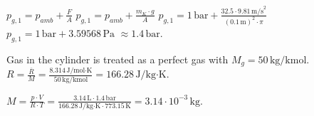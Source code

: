 \( p_{g,1} = p_{amb} + \frac{F}{A} \)  
\( p_{g,1} = p_{amb} + \frac{m_K \cdot g}{A} \)  
\( p_{g,1} = 1 \, \text{bar} + \frac{32.5 \cdot 9.81 \, \text{m/s}^2}{\left(0.1 \, \text{m}\right)^2 \cdot \pi} \)  
\( p_{g,1} = 1 \, \text{bar} + 3.59568 \, \text{Pa} \)  
\( \approx 1.4 \, \text{bar} \).  

Gas in the cylinder is treated as a perfect gas with \( M_g = 50 \, \text{kg/kmol} \).  
\( R = \frac{\overline{R}}{M} = \frac{8.314 \, \text{J/mol·K}}{50 \, \text{kg/kmol}} = 166.28 \, \text{J/kg·K} \).  

\( M = \frac{p \cdot V}{R \cdot T} = \frac{3.14 \, \text{L} \cdot 1.4 \, \text{bar}}{166.28 \, \text{J/kg·K} \cdot 773.15 \, \text{K}} = 3.14 \cdot 10^{-3} \, \text{kg} \).
